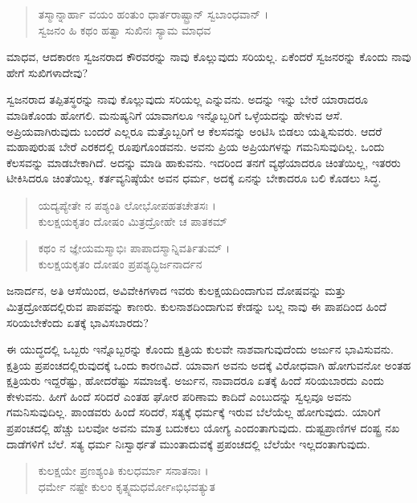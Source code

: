 \begin{verse}
ತಸ್ಮಾನ್ನಾರ್ಹಾ ವಯಂ ಹಂತುಂ ಧಾರ್ತರಾಷ್ಟ್ರಾನ್ ಸ್ವಬಾಂಧವಾನ್ ।\\ಸ್ವಜನಂ ಹಿ ಕಥಂ ಹತ್ವಾ ಸುಖಿನಃ ಸ್ಯಾಮ ಮಾಧವ 
\end{verse}

{\small ಮಾಧವ, ಆದಕಾರಣ ಸ್ವಜನರಾದ ಕೌರವರನ್ನು ನಾವು ಕೊಲ್ಲುವುದು ಸರಿಯಲ್ಲ. ಏಕೆಂದರೆ ಸ್ವಜನರನ್ನು ಕೊಂದು ನಾವು ಹೇಗೆ ಸುಖಿಗಳಾದೇವು?}

ಸ್ವಜನರಾದ ತಪ್ಪಿತಸ್ಥರನ್ನು ನಾವು ಕೊಲ್ಲುವುದು ಸರಿಯಲ್ಲ ಎನ್ನುವನು. ಅದನ್ನು ಇನ್ನು ಬೇರೆ ಯಾರಾದರೂ ಮಾಡಿಕೊಂಡು ಹೋಗಲಿ. ಮನುಷ್ಯನಿಗೆ ಯಾವಾಗಲೂ ಇನ್ನೊಬ್ಬರಿಗೆ ಒಳ್ಳೆಯದನ್ನು ಹೇಳುವ ಆಸೆ. ಅಪ್ರಿಯವಾಗಿರುವುದು ಬಂದರೆ ಎಲ್ಲರೂ ಮತ್ತೊಬ್ಬರಿಗೆ ಆ ಕೆಲಸವನ್ನು ಅಂಟಿಸಿ ಬಿಡಲು ಯತ್ನಿಸುವರು. ಆದರೆ ಮಹಾಪುರುಷ ಬೇರೆ ಎರಕದಲ್ಲಿ ರೂಪುಗೊಂಡವನು. ಅವನು ಪ್ರಿಯ ಅಪ್ರಿಯಗಳನ್ನು ಗಮನಿಸುವುದಿಲ್ಲ. ಒಂದು ಕೆಲಸವನ್ನು ಮಾಡಬೇಕಾಗಿದೆ. ಅದನ್ನು ಮಾಡಿ ಹಾಕುವನು. ಇದರಿಂದ ತನಗೆ ವ್ಯಥೆಯಾದರೂ ಚಿಂತೆಯಿಲ್ಲ, ಇತರರು ಟೀಕಿಸಿದರೂ ಚಿಂತೆಯಿಲ್ಲ. ಕರ್ತವ್ಯನಿಷ್ಠೆಯೇ ಅವನ ಧರ್ಮ, ಅದಕ್ಕೆ ಏನನ್ನು ಬೇಕಾದರೂ ಬಲಿ ಕೊಡಲು ಸಿದ್ಧ.

\begin{verse}
ಯದ್ಯಪ್ಯೇತೇ ನ ಪಶ್ಯಂತಿ ಲೋಭೋಪಹತಚೇತಸಃ ।\\ಕುಲಕ್ಷಯಕೃತಂ ದೋಷಂ ಮಿತ್ರದ್ರೋಹೇ ಚ ಪಾತಕಮ್ 
\end{verse}

\begin{verse}
ಕಥಂ ನ ಜ್ಞೇಯಮಸ್ಮಾಭಿಃ ಪಾಪಾದಸ್ಮಾನ್ನಿವರ್ತಿತುಮ್ ।\\ಕುಲಕ್ಷಯಕೃತಂ ದೋಷಂ ಪ್ರಪಶ್ಯದ್ಭಿರ್ಜನಾರ್ದನ 
\end{verse}

{\small ಜನಾರ್ದನ, ಅತಿ ಆಸೆಯಿಂದ, ಅವಿವೇಕಿಗಳಾದ ಇವರು ಕುಲಕ್ಷಯದಿಂದಾಗುವ ದೋಷವನ್ನು ಮತ್ತು ಮಿತ್ರದ್ರೋಹದಲ್ಲಿರುವ ಪಾಪವನ್ನು ಕಾಣರು. ಕುಲನಾಶದಿಂದಾಗುವ ಕೇಡನ್ನು ಬಲ್ಲ ನಾವು ಈ ಪಾಪದಿಂದ ಹಿಂದೆ ಸರಿಯಬೇಕೆಂದು ಏತಕ್ಕೆ ಭಾವಿಸಬಾರದು?}

ಈ ಯುದ್ಧದಲ್ಲಿ ಒಬ್ಬರು ಇನ್ನೊಬ್ಬರನ್ನು ಕೊಂದು ಕ್ಷತ್ರಿಯ ಕುಲವೇ ನಾಶವಾಗುವುದೆಂದು ಅರ್ಜುನ ಭಾವಿಸುವನು. ಕ್ಷತ್ರಿಯ ಪ್ರಪಂಚದಲ್ಲಿರುವುದಕ್ಕೆ ಒಂದು ಕಾರಣವಿದೆ. ಯಾವಾಗ ಅವನು ಅದಕ್ಕೆ ವಿರೋಧವಾಗಿ ಹೋಗುವನೋ ಅಂತಹ ಕ್ಷತ್ರಿಯರು ಇದ್ದರೆಷ್ಟು, ಹೋದರೆಷ್ಟು ಸಮಾಜಕ್ಕೆ. ಅರ್ಜುನ, ನಾವಾದರೂ ಏತಕ್ಕೆ ಹಿಂದೆ ಸರಿಯಬಾರದು ಎಂದು ಕೇಳುವನು. ಹೀಗೆ ಹಿಂದೆ ಸರಿದರೆ ಎಂತಹ ಘೋರ ಪರಿಣಾಮ ಕಾದಿದೆ ಎಂಬುದನ್ನು ಸ್ವಲ್ಪವೂ ಅವನು ಗಮನಿಸುವುದಿಲ್ಲ. ಪಾಂಡವರು ಹಿಂದೆ ಸರಿದರೆ, ಸತ್ಯಕ್ಕೆ ಧರ್ಮಕ್ಕೆ ಇರುವ ಬೆಲೆಯೆಲ್ಲ ಹೋಗುವುದು. ಯಾರಿಗೆ ಪ್ರಪಂಚದಲ್ಲಿ ಹೆಚ್ಚು ಬಲವೋ ಅವನು ಮಾತ್ರ ಬದುಕಲು ಯೋಗ್ಯ ಎಂದಂತಾಗುವುದು. ದುಷ್ಟಪ್ರಾಣಿಗಳ ದಂಷ್ಟ್ರ ನಖ ದಾಡೆಗಳಿಗೆ ಬೆಲೆ. ಸತ್ಯ ಧರ್ಮ ನಿಃಸ್ವಾರ್ಥತೆ ಮುಂತಾದುವಕ್ಕೆ ಪ್ರಪಂಚದಲ್ಲಿ ಬೆಲೆಯೇ ಇಲ್ಲದಂತಾಗುವುದು.

\begin{verse}
ಕುಲಕ್ಷಯೇ ಪ್ರಣಶ್ಯಂತಿ ಕುಲಧರ್ಮಾ ಸನಾತನಾಃ ।\\ಧರ್ಮೇ ನಷ್ಟೇ ಕುಲಂ ಕೃತ್ಸ್ನಮಧರ್ಮೋsಭಿಭವತ್ಯುತ 
\end{verse}

